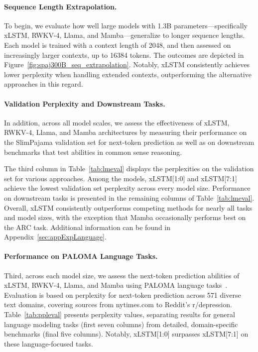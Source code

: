 \paragraph{Sequence Length Extrapolation.}
\label{sec:spaj300B_ctx_extrapolation}
To begin, we evaluate how well large models with 1.3B parameters—specifically xLSTM, RWKV-4, Llama, and Mamba—generalize to longer sequence lengths. Each model is trained with a context length of 2048, and then assessed on increasingly larger contexts, up to 16384 tokens. The outcomes are depicted in Figure~\ref{fig:spaj300B_seq_extrapolation}. Notably, xLSTM consistently achieves lower perplexity when handling extended contexts, outperforming the alternative approaches in this regard.

\paragraph{Validation Perplexity and Downstream Tasks.}
\label{sec:spaj_downstream_eval}
In addition, across all model scales, we assess the effectiveness of xLSTM, RWKV-4, Llama, and Mamba architectures by measuring their performance on the SlimPajama validation set for next-token prediction as well as on downstream benchmarks that test abilities in common sense reasoning.

The third column in Table~\ref{tab:lmeval} displays the perplexities on the validation set for various approaches. Among the models, xLSTM[1:0] and xLSTM[7:1] achieve the lowest validation set perplexity across every model size. Performance on downstream tasks is presented in the remaining columns of Table~\ref{tab:lmeval}. Overall, xLSTM consistently outperforms competing methods for nearly all tasks and model sizes, with the exception that Mamba occasionally performs best on the ARC task. Additional information can be found in Appendix~\ref{sec:appExpLanguage}.

\paragraph{Performance on PALOMA Language Tasks.} Third, across each model size, we assess the next-token prediction abilities of xLSTM, RWKV-4, Llama, and Mamba using PALOMA language tasks~\citep{Magnusson:23arxivshort}. Evaluation is based on perplexity for next-token prediction across 571 diverse text domains, covering sources from nytimes.com to Reddit’s r/depression. 
Table~\ref{tab:ppleval} presents perplexity values, separating results for general language modeling tasks (first seven columns) from detailed, domain-specific benchmarks (final five columns). Notably, xLSTM[1:0] surpasses xLSTM[7:1] on these language-focused tasks.

